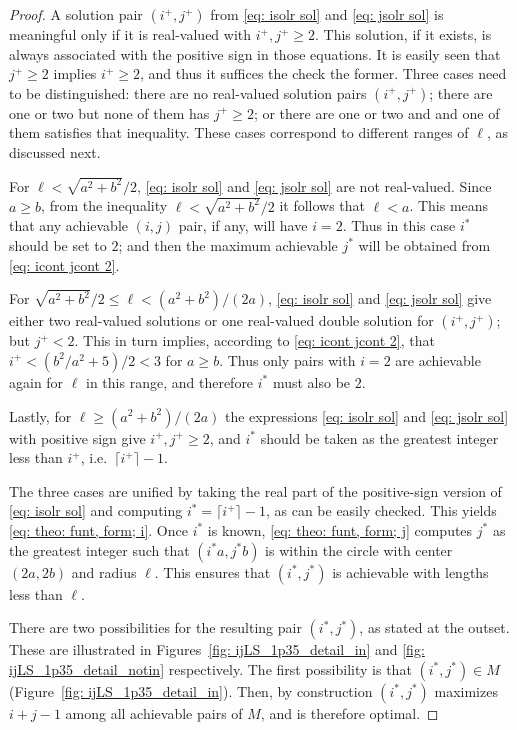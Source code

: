 \documentclass[12pt, a4paper]{article}
\newcommand{\len}{\ell} %
\newcommand{\isolr}{i^+}
\newcommand{\jsolr}{j^+}
\newcommand{\isoli}{i^\ast}
\newcommand{\jsoli}{j^\ast}
\newcommand{\mss}{M}
\begin{document}
\begin{proof}
A solution pair $(\isolr, \jsolr)$ from \eqref{eq: isolr sol} and \eqref{eq: jsolr sol} is meaningful only if it is real-valued with $\isolr, \jsolr \geq 2$. This solution, if it exists, is always associated with the positive sign in those equations. It is easily seen that $\jsolr \geq 2$ implies $\isolr \geq 2$, and thus it suffices the check the former. Three cases need to be distinguished: there are no real-valued solution pairs $(\isolr, \jsolr)$; there are one or two but none of them has $\jsolr \geq 2$; or there are one or two and and one of them satisfies that inequality. These cases correspond to different ranges of $\len$, as discussed next.

For $\len < \sqrt{a^2+b^2}/2$, \eqref{eq: isolr sol} and \eqref{eq: jsolr sol} are not real-valued. Since $a \geq b$, from the inequality $\len < \sqrt{a^2+b^2}/2$ it follows that $\len < a$. This means that any achievable $(i,j)$ pair, if any, will have $i=2$. Thus in this case $\isoli$ should be set to $2$; and then the maximum achievable $\jsoli$ will be obtained from \eqref{eq: icont jcont 2}.

For $\sqrt{a^2+b^2}/2 \leq \len < (a^2+b^2) / (2a)$, \eqref{eq: isolr sol} and \eqref{eq: jsolr sol} give either two real-valued solutions or one real-valued double solution for $(\isolr, \jsolr)$; but $\jsolr < 2$. This in turn implies, according to \eqref{eq: icont jcont 2}, that $\isolr < (b^2/a^2+5)/2 < 3$ for $a \geq b$. Thus only pairs with $i=2$ are achievable again for $\len$ in this range, and therefore $\isoli$ must also be $2$.

Lastly, for $\len \geq (a^2+b^2) / (2a)$ the expressions \eqref{eq: isolr sol} and \eqref{eq: jsolr sol} with positive sign give $\isolr, \jsolr \geq 2$, and $\isoli$ should be taken as the greatest integer less than $\isolr$, i.e.~$\lceil \isolr \rceil-1$.
 
The three cases are unified by taking the real part of the positive-sign version of \eqref{eq: isolr sol} and computing $\isoli = \lceil \isolr \rceil-1$, as can be easily checked. This yields \eqref{eq: theo: funt, form; i}. Once $\isoli$ is known, \eqref{eq: theo: funt, form; j} computes $\jsoli$ as the greatest integer such that $(\isoli a,\jsoli b)$ is within the circle with center $(2a,2b)$ and radius $\len$. This ensures that $(\isoli,\jsoli)$ is achievable with lengths less than $\len$.

There are two possibilities for the resulting pair $(\isoli,\jsoli)$, as stated at the outset. These are illustrated in Figures~\ref{fig: ijLS_1p35_detail_in} and \ref{fig: ijLS_1p35_detail_notin} respectively. The first possibility is that $(\isoli,\jsoli) \in \mss$ (Figure~\ref{fig: ijLS_1p35_detail_in}). Then, by construction  $(\isoli,\jsoli)$ maximizes $i+j-1$ among all achievable pairs of $\mss$, and is therefore optimal.


\end{proof}
\end{document}
